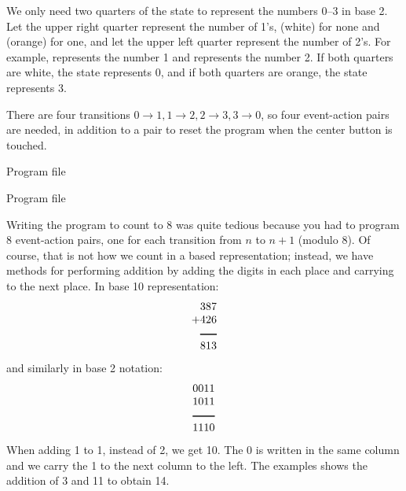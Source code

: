 We only need two quarters of the state to represent the numbers
0--3 in base 2.
Let the upper right quarter represent the number of 1's,
 (white) for none and  (orange) for one,
and let the upper left quarter represent the number of 2's.
For example,  represents the number 1 and
 represents the number 2.
If both quarters are white, the state represents 0, and if both
quarters are orange, the state represents 3.

There are four transitions $0\rightarrow 1, 1\rightarrow 2, 2
\rightarrow 3, 3\rightarrow 0$, so four event-action pairs
are needed, in addition to a pair to reset the program
when the center button is touched.

{\raggedleft \hfill Program file }

\medskip


\medskip


{\raggedleft \hfill Program file }



Writing the program to count to 8 was quite tedious because you had to
program 8 event-action pairs, one for each transition from $n$ to $n+1$
(modulo 8). Of course, that is not how we count in a based
representation;
instead, we have methods for performing addition by adding the digits
in each place and carrying to the next place. In base 10
representation:
\begin{displaymath}
\begin{array}{r}
387\\
+426\\
\rule[1pt]{1.5em}{1pt}\\
813\\
\end{array}
\end{displaymath}
and similarly in base 2 notation:
\begin{displaymath}
\begin{array}{r}
0011\\
1011\\
\rule[1pt]{2em}{1pt}\\
1110\\
\end{array}
\end{displaymath}
When adding 1 to 1, instead of 2, we get 10.
The 0 is written in the same column and we carry the 1 to the next
column to the left.
The examples shows the addition of 3 and 11 to obtain 14.

